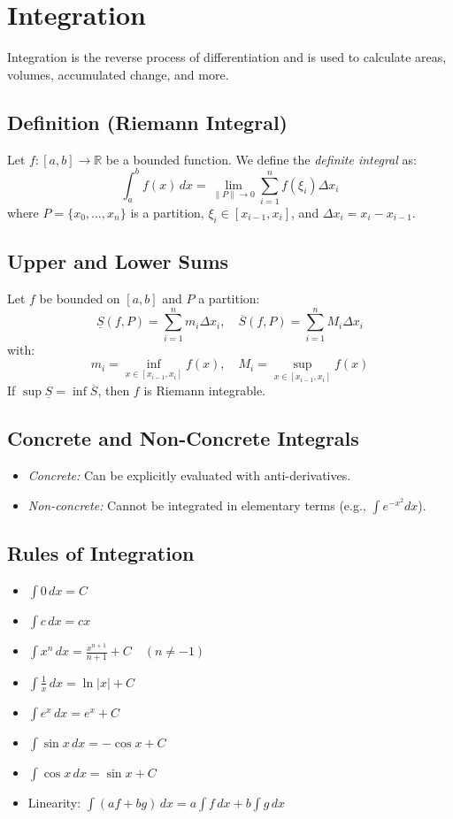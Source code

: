 \newpage
\section{Integration}

Integration is the reverse process of differentiation and is used to calculate areas, volumes, accumulated change, and more.

\subsection{Definition (Riemann Integral)}

Let \(f: [a, b] \to \mathbb{R}\) be a bounded function. We define the \emph{definite integral} as:
\[
\int_a^b f(x)\,dx = \lim_{\|P\| \to 0} \sum_{i=1}^n f(\xi_i)\Delta x_i
\]
where \(P = \{x_0, \dots, x_n\}\) is a partition, \(\xi_i \in [x_{i-1}, x_i]\), and \(\Delta x_i = x_i - x_{i-1}\).

\subsection{Upper and Lower Sums}

Let \(f\) be bounded on \([a, b]\) and \(P\) a partition:
\[
\underline{S}(f, P) = \sum_{i=1}^n m_i \Delta x_i, \quad
\overline{S}(f, P) = \sum_{i=1}^n M_i \Delta x_i
\]
with:
\[
m_i = \inf_{x \in [x_{i-1}, x_i]} f(x), \quad
M_i = \sup_{x \in [x_{i-1}, x_i]} f(x)
\]
If \(\sup \underline{S} = \inf \overline{S}\), then \(f\) is Riemann integrable.

\subsection{Concrete and Non-Concrete Integrals}

\begin{itemize}[label=\(-\)]
\item \emph{Concrete:} Can be explicitly evaluated with anti-derivatives.
\item \emph{Non-concrete:} Cannot be integrated in elementary terms (e.g., \(\int e^{-x^2} dx\)).
\end{itemize}

\subsection{Rules of Integration}

\begin{itemize}[label=\(-\)]
\item \(\int 0\,dx = C\)
\item \(\int c\,dx = cx\)
\item \(\int x^n\,dx = \frac{x^{n+1}}{n+1} + C \quad (n \ne -1)\)
\item \(\int \frac{1}{x}\,dx = \ln|x| + C\)
\item \(\int e^x\,dx = e^x + C\)
\item \(\int \sin x\,dx = -\cos x + C\)
\item \(\int \cos x\,dx = \sin x + C\)
\item Linearity: \(\int (af + bg)\,dx = a\int f\,dx + b\int g\,dx\)
\end{itemize}

